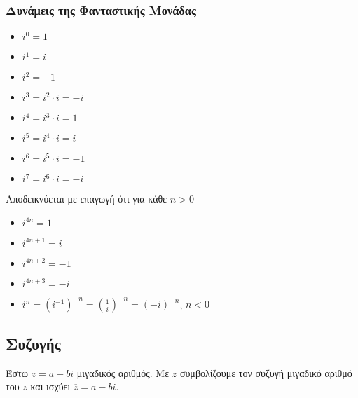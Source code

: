     \subsubsection*{Δυνάμεις της Φανταστικής Μονάδας}

          \begin{multicols}{2}
        \begin{itemize}
        \item $i^{0}=1$
        \item $i^{1}=i$
        \item $i^{2}=-1$
        \item $i^{3}=i^{2}\cdot i=-i$
\end{itemize}

        \columnbreak

  \begin{itemize}
        \item $i^{4}=i^{3}\cdot i=1$
        \item $i^{5}=i^{4}\cdot i=i$
        \item $i^{6}=i^{5}\cdot i=-1$
        \item $i^{7}=i^{6}\cdot i=-i$
  \end{itemize}
    \end{multicols}


        Αποδεικνύεται με επαγωγή ότι για κάθε $n>0$

        \begin{multicols}{2}
          \begin{itemize}
            \item $i^{4n}=1$
            \item $i^{4n+1}=i$
            \item $i^{4n+2}=-1$
            \item $i^{4n+3}=-i$
          \end{itemize}
          \columnbreak
          \begin{itemize}
            \item $i^{n}=(i^{-1})^{-n}=\left(\frac{1}{i}\right)^{-n}=(-i)^{-n}$, $n<0$
          \end{itemize}
        \end{multicols}

\subsection*{Συζυγής}

Έστω $z=a+bi$ μιγαδικός αριθμός. Με $\overline{z}$ συμβολίζουμε
 τον {\color{blue} συζυγή} μιγαδικό αριθμό του $z$ και ισχύει $\overline{z}=a-bi$.

